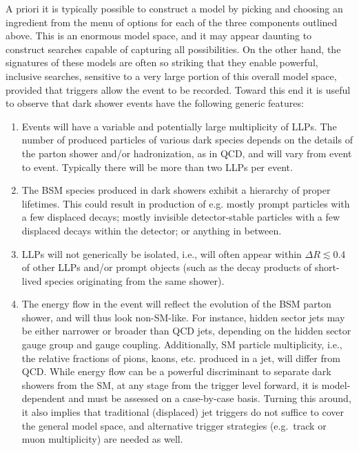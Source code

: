 A priori it is typically possible to construct a model by picking and choosing an ingredient from the menu of options for each of the three components outlined above. This is an enormous model space, and it may appear daunting to construct searches capable of capturing all possibilities. On the other hand, the signatures of these models are often so striking that they enable powerful, inclusive searches, sensitive to a very large portion of this overall model space, provided that triggers allow the event to be recorded. Toward this end it is useful to observe that dark shower events have the following generic features:
%
\begin {enumerate}

\item Events will have a variable and potentially large multiplicity
  of LLPs.  The number of produced particles of various dark species
  depends on the details of the parton shower and/or hadronization, as
  in QCD, and will vary from event to event.  Typically there will be
  more than two LLPs per event.

\item The BSM species produced in dark showers exhibit a hierarchy of
  proper lifetimes.  This could result in production of e.g. mostly
  prompt particles with a few displaced decays; mostly invisible
  detector-stable particles with a few displaced decays within the
  detector; or anything in between.

\item LLPs will not generically be isolated, i.e., will often appear
  within $\Delta R \lesssim 0.4$ of other LLPs and/or prompt objects
  (such as the decay products of short-lived species originating from
  the same shower).

\item The energy flow in the event will reflect the evolution of the
  BSM parton shower, and will thus look non-SM-like.  For instance,
  hidden sector jets may be either narrower or broader than QCD jets,
  depending on the hidden sector gauge group and gauge coupling.
  Additionally, SM particle multiplicity, i.e., the relative fractions
  of pions, kaons, etc. produced in a jet, will differ from QCD. 
While energy flow can be a powerful discriminant
to separate dark showers from the SM, at any stage from the trigger
level forward, it is model-dependent and must be assessed on a
case-by-case basis. Turning this around, it also implies that traditional (displaced) jet triggers do not suffice to cover the general model space, and alternative trigger strategies (e.g.~track or muon multiplicity) are needed as well.

\end {enumerate}

